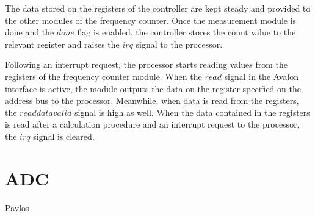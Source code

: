 The data stored on the registers of the controller are kept steady and provided to the other modules of the frequency counter. Once the measurement module is done and the $done$ flag is enabled, the controller stores the count value to the relevant register and raises the $irq$ signal to the processor.

Following an interrupt request, the processor starts reading values from the registers of the frequency counter module. When the $read$ signal in the Avalon interface is active, the module outputs the data on the register specified on the address bus to the processor. Meanwhile, when data is read from the registers, the $readdatavalid$ signal is high as well. When the data contained in the registers is read after a calculation procedure and an interrupt request to the processor, the $irq$ signal is cleared.


\section{ADC}
Pavlos